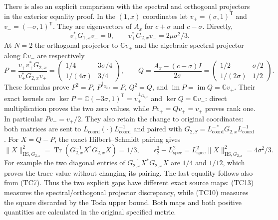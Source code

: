 There is also an explicit comparison with the spectral and orthogonal
projectors in the exterior equality proof. In the $(1,x)$ coordinates
let $v_+=(\sigma,1)^{\mathsf T}$ and $v_-=(-\sigma,1)^{\mathsf T}$.
They are eigenvectors of $A_x$ for $c+\sigma$ and $c-\sigma$. Directly,
\[
 v_+^*G_{1,x}v_-=0,\qquad
 v_+^*G_{2,x}v_-=2\mu\sigma^2/3.
 \tag{TC11}
\]
At $N=2$ the orthogonal projector to $\mathbb Cv_+$ and the algebraic
spectral projector along $\mathbb Cv_-$ are respectively
\[
 P=\frac{v_+v_+^*G_{2,x}}{v_+^*G_{2,x}v_+}
   =\begin{pmatrix}1/4&3\sigma/4\\1/(4\sigma)&3/4\end{pmatrix},
 \qquad
 Q=\frac{A_x-(c-\sigma)I}{2\sigma}
   =\begin{pmatrix}1/2&\sigma/2\\1/(2\sigma)&1/2\end{pmatrix}.
 \tag{TC12}
\]
These formulas prove $P^2=P$, $P^{\dagger_{G_{2,x}}}=P$, $Q^2=Q$,
and $\operatorname{im}P=\operatorname{im}Q=\mathbb Cv_+$.
Their exact kernels are
$\ker P=\mathbb C(-3\sigma,1)^{\mathsf T}=v_+^{\perp_{G_{2,x}}}$
and $\ker Q=\mathbb Cv_-$: direct multiplication proves the two
zero values, while $Pv_+=Qv_+=v_+$ proves rank one.
In particular $Pv_-=v_+/2$.
They also retain the change to original coordinates: both matrices are
sent to $L_{\mathrm{coord}}(\cdot)L_{\mathrm{coord}}^{-1}$ and paired
with $G_{2,S}=L_{\mathrm{coord}}^{-*}G_{2,x}L_{\mathrm{coord}}^{-1}$.
For $X=Q-P$, the exact Hilbert--Schmidt pairing gives
\[
 \|X\|_{\mathrm{HS},G_{2,x}}^2
 =\operatorname{Tr}(G_{2,x}^{-1}X^*G_{2,x}X)=1/3,
 \qquad
 \epsilon_2^2-L_{\mathrm{spec}}^2
      =L_{\mathrm{spec}}^2\|X\|_{\mathrm{HS},G_{2,x}}^2
      =4\sigma^2/3.
 \tag{TC13}
\]
For example the two diagonal entries of
$G_{2,x}^{-1}X^*G_{2,x}X$ are $1/4$ and $1/12$, which proves the
trace value without changing its pairing. The last equality follows
also from (TC7). Thus the two explicit gaps have different exact source
maps: (TC13) measures the spectral/orthogonal projector discrepancy,
while (TC10) measures the square discarded by the Toda upper bound.
Both maps and both positive quantities are calculated in the original
specified metric.
